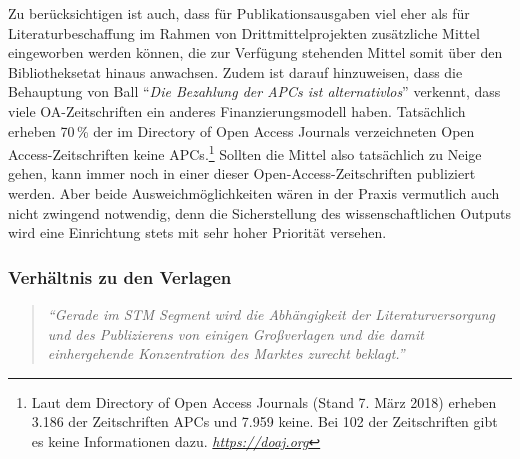 \documentclass[a4paper,
fontsize=11pt,
oneside,
numbers=noperiodatend,
parskip=half-,
bibliography=totoc,
final
]{scrartcl}
\begin{document}
Zu berücksichtigen ist auch, dass für Publikationsausgaben viel eher als
für Literaturbeschaffung im Rahmen von Drittmittelprojekten zusätzliche
Mittel eingeworben werden können, die zur Verfügung stehenden Mittel
somit über den Bibliotheksetat hinaus anwachsen. Zudem ist darauf
hinzuweisen, dass die Behauptung von Ball \enquote{\emph{Die Bezahlung
der APCs ist alternativlos}} verkennt, dass viele OA-Zeitschriften ein
anderes Finanzierungsmodell haben. Tatsächlich erheben 70\,\% der im
Directory of Open Access Journals verzeichneten Open
Access-Zeitschriften keine APCs.\footnote{Laut dem Directory of Open
  Access Journals (Stand 7. März 2018) erheben 3.186 der Zeitschriften
  APCs und 7.959 keine. Bei 102 der Zeitschriften gibt es keine
  Informationen dazu. \href{https://doaj.org}{\emph{https://doaj.org}}}
Sollten die Mittel also tatsächlich zu Neige gehen, kann immer noch in
einer dieser Open-Access-Zeitschriften publiziert werden. Aber beide
Ausweichmöglichkeiten wären in der Praxis vermutlich auch nicht zwingend
notwendig, denn die Sicherstellung des wissenschaftlichen Outputs wird
eine Einrichtung stets mit sehr hoher Priorität versehen.

\subsubsection{Verhältnis zu den
Verlagen}\label{verhuxe4ltnis-zu-den-verlagen}

\begin{quote}
\emph{\enquote{Gerade im STM Segment wird die Abhängigkeit der
Literaturversorgung und des Publizierens von einigen Großverlagen und
die damit einhergehende Konzentration des Marktes zurecht beklagt.}}
\end{quote}
\end{document}
